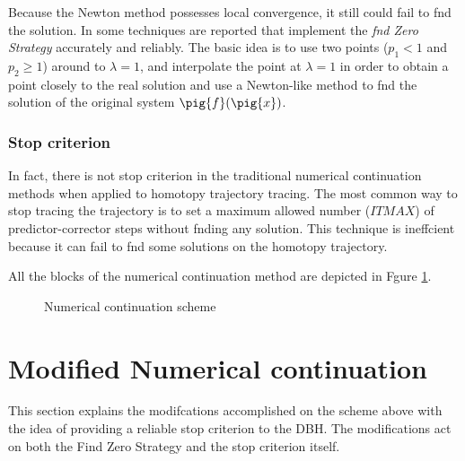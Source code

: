 \documentclass[conference]{IEEEtran}
\begin{document}
Because the Newton method possesses local convergence, it still could fail
to fnd the solution. In \cite{homo_sosonkina} some techniques are reported
that implement the {\it fnd Zero Strategy} accurately and
reliably.  The basic idea is
to use two points ($p_1 < 1$ and $p_2 \geq 1$) around to $\lambda=1$, and interpolate the point at $\lambda=1$ in order to
obtain a point closely to the real solution and use a Newton-like method to fnd the solution
of the original system $\pig{f}(\pig{x})$.

\subsubsection{Stop criterion}

In fact, there is not stop criterion in the traditional numerical continuation methods when applied to homotopy trajectory tracing.
The most common way to stop tracing the trajectory  is to set a maximum allowed number ($ITMAX$) of predictor-corrector steps without fnding
any solution. This technique is ineffcient because it can fail
to fnd some solutions on the homotopy trajectory.

All the blocks of the numerical continuation method are depicted in Fgure \ref{bloquesf}. 





\begin{figure}[hbtp]
\centerline{
\epsfxsize=46mm
}
\caption{Numerical continuation scheme}
\label{bloquesf}
\end{figure}


\section{Modified Numerical continuation}

This section explains the modifcations accomplished on the
scheme above with the idea of providing a reliable stop criterion
to the DBH. The modifications act on both the Find Zero Strategy and
the stop criterion itself.
\end{document}
